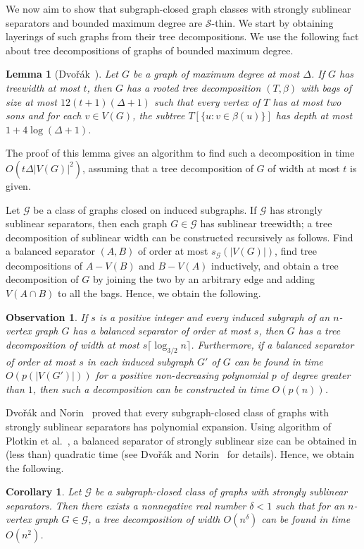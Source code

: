 \documentclass[a4paper,11pt]{article}
\newcommand{\GG}{{\mathcal G}}
\newcommand{\Ss}{{\mathcal S}}
\newtheorem{corollary}[theorem]{Corollary}
\newtheorem{lemma}[theorem]{Lemma}
\newtheorem{observation}[theorem]{Observation}
\begin{document}
We now aim to show that subgraph-closed graph classes with strongly sublinear separators and bounded maximum degree
are $\Ss$-thin.  We start by obtaining layerings of such graphs from their tree decompositions.
We use the following fact about tree decompositions of graphs of bounded maximum degree.
\begin{lemma}[Dvo\v{r}\'ak~\cite{twd}]\label{lemma-few}
Let $G$ be a graph of maximum degree at most $\Delta$.  If $G$ has treewidth at most $t$, then $G$ has a rooted
tree decomposition $(T,\beta)$ with bags of size at most $12(t+1)(\Delta+1)$ such that every vertex of $T$ has at
most two sons and for each $v\in V(G)$, the subtree $T[\{u:v\in \beta(u)\}]$ has depth at most $1+4\log(\Delta+1)$.
\end{lemma}
The proof of this lemma gives an algorithm to find such a decomposition in time $O(t\Delta|V(G)|^2)$, assuming that a tree decomposition
of $G$ of width at most $t$ is given.

Let $\GG$ be a class of graphs closed on induced subgraphs.  If $\GG$ has strongly sublinear separators,
then each graph $G\in \GG$ has sublinear treewidth; a tree decomposition of sublinear width can be constructed
recursively as follows. Find a balanced separator $(A,B)$ of order at most $s_{\GG}(|V(G)|)$,
find tree decompositions of $A-V(B)$ and $B-V(A)$ inductively, and obtain a tree decomposition of $G$ by joining
the two by an arbitrary edge and adding $V(A\cap B)$ to all the bags.  Hence, we obtain the following.
\begin{observation}\label{obs-twss}
If $s$ is a positive integer and every induced subgraph of an $n$-vertex graph $G$ has a balanced separator of order at most $s$,
then $G$ has a tree decomposition of width at most $s\lceil \log_{3/2} n\rceil$.  Furthermore, if a balanced separator of order
at most $s$ in each induced subgraph $G'$ of $G$ can be found in time $O(p(|V(G')|))$ for a positive non-decreasing polynomial $p$ of degree greater than $1$, then such a
decomposition can be constructed in time $O(p(n))$.
\end{observation}
Dvo\v{r}\'ak and Norin~\cite{dvorak2016strongly} proved that every subgraph-closed class of graphs with strongly sublinear separators has polynomial
expansion.  Using algorithm of Plotkin et al.~\cite{plotkin}, a balanced separator of strongly sublinear size can be obtained in
(less than) quadratic time (see Dvo\v{r}\'ak and Norin~\cite[Corollary 2]{dvorak2016strongly} for details).
Hence, we obtain the following.
\begin{corollary}\label{cor-twss}
Let $\GG$ be a subgraph-closed class of graphs with strongly sublinear separators.  Then there exists a nonnegative real number $\delta<1$
such that for an $n$-vertex graph $G\in\GG$, a tree decomposition of width $O(n^\delta)$ can be found in time $O(n^2)$.
\end{corollary}
\end{document}

